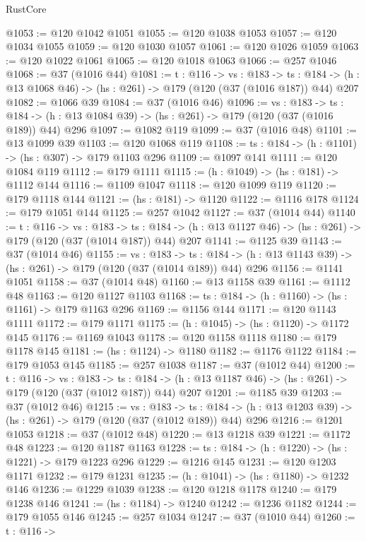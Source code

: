 \begin{lexlean}{RustCore}
\begin{coremodule}
@1053 := @120 @1042 @1051
@1055 := @120 @1038 @1053
@1057 := @120 @1034 @1055
@1059 := @120 @1030 @1057
@1061 := @120 @1026 @1059
@1063 := @120 @1022 @1061
@1065 := @120 @1018 @1063
@1066 := @257 @1046
@1068 := @37 (@1016 @44)
@1081 := {t : @116} ->
  {vs : @183} ->
  {ts : @184} -> (h : @13 @1068 @46) -> (hs : @261) -> @179 (@120 (@37 (@1016 @187)) @44) @207
@1082 := @1066 @39
@1084 := @37 (@1016 @46)
@1096 := {vs : @183} ->
  {ts : @184} -> (h : @13 @1084 @39) -> (hs : @261) -> @179 (@120 (@37 (@1016 @189)) @44) @296
@1097 := @1082 @119
@1099 := @37 (@1016 @48)
@1101 := @13 @1099 @39
@1103 := @120 @1068 @119
@1108 := {ts : @184} -> (h : @1101) -> (hs : @307) -> @179 @1103 @296
@1109 := @1097 @141
@1111 := @120 @1084 @119
@1112 := @179 @1111
@1115 := (h : @1049) -> (hs : @181) -> @1112 @144
@1116 := @1109 @1047
@1118 := @120 @1099 @119
@1120 := @179 @1118 @144
@1121 := (hs : @181) -> @1120
@1122 := @1116 @178
@1124 := @179 @1051 @144
@1125 := @257 @1042
@1127 := @37 (@1014 @44)
@1140 := {t : @116} ->
  {vs : @183} ->
  {ts : @184} -> (h : @13 @1127 @46) -> (hs : @261) -> @179 (@120 (@37 (@1014 @187)) @44) @207
@1141 := @1125 @39
@1143 := @37 (@1014 @46)
@1155 := {vs : @183} ->
  {ts : @184} -> (h : @13 @1143 @39) -> (hs : @261) -> @179 (@120 (@37 (@1014 @189)) @44) @296
@1156 := @1141 @1051
@1158 := @37 (@1014 @48)
@1160 := @13 @1158 @39
@1161 := @1112 @48
@1163 := @120 @1127 @1103
@1168 := {ts : @184} -> (h : @1160) -> (hs : @1161) -> @179 @1163 @296
@1169 := @1156 @144
@1171 := @120 @1143 @1111
@1172 := @179 @1171
@1175 := (h : @1045) -> (hs : @1120) -> @1172 @145
@1176 := @1169 @1043
@1178 := @120 @1158 @1118
@1180 := @179 @1178 @145
@1181 := (hs : @1124) -> @1180
@1182 := @1176 @1122
@1184 := @179 @1053 @145
@1185 := @257 @1038
@1187 := @37 (@1012 @44)
@1200 := {t : @116} ->
  {vs : @183} ->
  {ts : @184} -> (h : @13 @1187 @46) -> (hs : @261) -> @179 (@120 (@37 (@1012 @187)) @44) @207
@1201 := @1185 @39
@1203 := @37 (@1012 @46)
@1215 := {vs : @183} ->
  {ts : @184} -> (h : @13 @1203 @39) -> (hs : @261) -> @179 (@120 (@37 (@1012 @189)) @44) @296
@1216 := @1201 @1053
@1218 := @37 (@1012 @48)
@1220 := @13 @1218 @39
@1221 := @1172 @48
@1223 := @120 @1187 @1163
@1228 := {ts : @184} -> (h : @1220) -> (hs : @1221) -> @179 @1223 @296
@1229 := @1216 @145
@1231 := @120 @1203 @1171
@1232 := @179 @1231
@1235 := (h : @1041) -> (hs : @1180) -> @1232 @146
@1236 := @1229 @1039
@1238 := @120 @1218 @1178
@1240 := @179 @1238 @146
@1241 := (hs : @1184) -> @1240
@1242 := @1236 @1182
@1244 := @179 @1055 @146
@1245 := @257 @1034
@1247 := @37 (@1010 @44)
@1260 := {t : @116} ->

\end{coremodule}
\end{lexlean}
